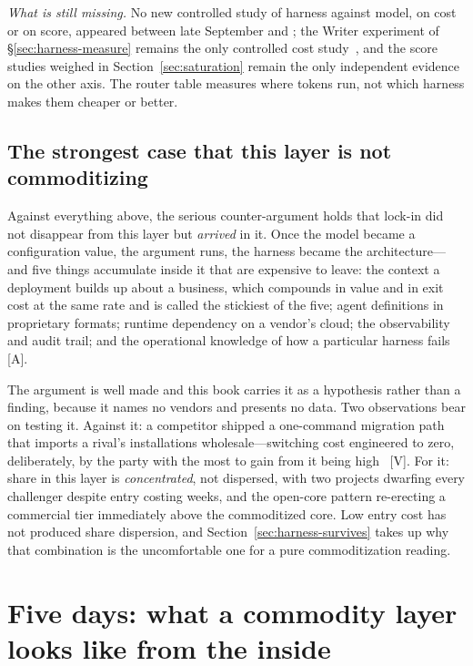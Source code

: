 \emph{What is still missing.} No new controlled study of harness against model, on cost or on score, appeared between late September and \datafreeze; the Writer experiment of \S\ref{sec:harness-measure} remains the only controlled cost study~\cite{harness-effect}, and the score studies weighed in Section~\ref{sec:saturation} remain the only independent evidence on the other axis. The router table measures where tokens run, not which harness makes them cheaper or better.

\subsection{The strongest case that this layer is not commoditizing}

Against everything above, the serious counter-argument holds that lock-in did not disappear from this layer but \emph{arrived} in it. Once the model became a configuration value, the argument runs, the harness became the architecture---and five things accumulate inside it that are expensive to leave: the context a deployment builds up about a business, which compounds in value and in exit cost at the same rate and is called the stickiest of the five; agent definitions in proprietary formats; runtime dependency on a vendor's cloud; the observability and audit trail; and the operational knowledge of how a particular harness fails~\cite{harness-lockin} [A].

The argument is well made and this book carries it as a hypothesis rather than a finding, because it names no vendors and presents no data. Two observations bear on testing it. Against it: a competitor shipped a one-command migration path that imports a rival's installations wholesale---switching cost engineered to zero, deliberately, by the party with the most to gain from it being high~\cite{harness-field} [V]. For it: share in this layer is \emph{concentrated}, not dispersed, with two projects dwarfing every challenger despite entry costing weeks, and the open-core pattern re-erecting a commercial tier immediately above the commoditized core. Low entry cost has not produced share dispersion, and Section~\ref{sec:harness-survives} takes up why that combination is the uncomfortable one for a pure commoditization reading.

\section{Five days: what a commodity layer looks like from the inside}
\label{sec:jev}

